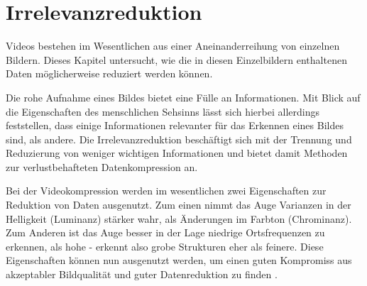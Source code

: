 \chapter{Irrelevanzreduktion}
\label{kap:Irrelevanzreduktion}


Videos bestehen im Wesentlichen aus einer Aneinanderreihung von einzelnen Bildern. Dieses Kapitel untersucht, wie die in diesen Einzelbildern enthaltenen Daten möglicherweise reduziert werden können.

Die rohe Aufnahme eines Bildes bietet eine Fülle an Informationen. Mit Blick auf die Eigenschaften des menschlichen Sehsinns lässt sich hierbei allerdings feststellen, dass einige Informationen relevanter für das Erkennen eines Bildes sind, als andere. Die Irrelevanzreduktion beschäftigt sich mit der Trennung und Reduzierung von weniger wichtigen Informationen und bietet damit Methoden zur verlustbehafteten Datenkompression an.

Bei der Videokompression werden im wesentlichen zwei Eigenschaften zur Reduktion von Daten ausgenutzt. Zum einen nimmt das Auge Varianzen in der Helligkeit (Luminanz) stärker wahr, als Änderungen im Farbton (Chrominanz). Zum Anderen ist das Auge besser in der Lage niedrige Ortsfrequenzen zu erkennen, als hohe - erkennt also grobe Strukturen eher als feinere. Diese Eigenschaften können nun ausgenutzt werden, um einen guten Kompromiss aus akzeptabler Bildqualität und guter Datenreduktion zu finden \cite{akramullah_digital_2014}.

